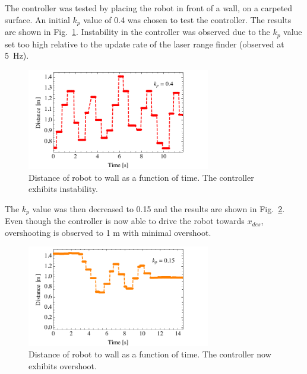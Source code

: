 \documentclass[conference]{../IEEEtran}
\begin{document}
The controller was tested by placing the robot in front of a wall, on a carpeted surface.
An initial $k_p$ value of 0.4 was chosen to test the controller. The results are shown in
Fig.~\ref{fig:unstable}. Instability in the controller was observed due to the $k_p$ value
set too high relative to the update rate of the laser range finder (observed at
\SI{5}{\Hz}).
%
\begin{figure}[h]
  \centering
  \includegraphics[width = 8cm]{figures/unstable}
  \caption{Distance of robot to wall as a function of time.
           The controller exhibits instability.}
   \label{fig:unstable}
\end{figure}
%
The $k_p$ value was then decreased to 0.15 and the results are shown in
Fig.~\ref{fig:semi_stable}. Even though the controller is now able to drive the robot
towards $x_{des}$, overshooting is observed to 1 m with minimal overshoot.
\begin{figure}[h]
  \centering
  \includegraphics[width = 8cm]{figures/semi_stable}
  \caption{Distance of robot to wall as a function of time.
           The controller now exhibits overshoot.}
   \label{fig:semi_stable}
\end{figure}
\end{document}
